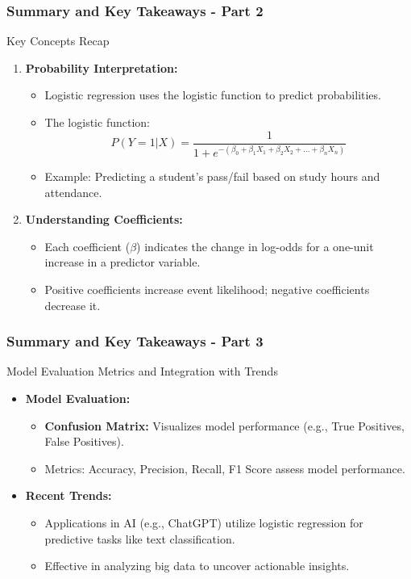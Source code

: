 \documentclass[aspectratio=169]{beamer}
\begin{document}
\begin{frame}[fragile]
    \frametitle{Summary and Key Takeaways - Part 2}
    \begin{block}{Key Concepts Recap}
        \begin{enumerate}
            \item \textbf{Probability Interpretation:}
                \begin{itemize}
                    \item Logistic regression uses the logistic function to predict probabilities.
                    \item The logistic function:
                    \[
                    P(Y=1|X) = \frac{1}{1 + e^{-(\beta_0 + \beta_1X_1 + \beta_2X_2 + \ldots + \beta_nX_n)}}
                    \]
                    \item Example: Predicting a student's pass/fail based on study hours and attendance.
                \end{itemize}
            \item \textbf{Understanding Coefficients:}
                \begin{itemize}
                    \item Each coefficient (\(\beta\)) indicates the change in log-odds for a one-unit increase in a predictor variable.
                    \item Positive coefficients increase event likelihood; negative coefficients decrease it.
                \end{itemize}
        \end{enumerate}
    \end{block}
\end{frame}

\begin{frame}[fragile]
    \frametitle{Summary and Key Takeaways - Part 3}
    \begin{block}{Model Evaluation Metrics and Integration with Trends}
        \begin{itemize}
            \item \textbf{Model Evaluation:}
                \begin{itemize}
                    \item \textbf{Confusion Matrix:} Visualizes model performance (e.g., True Positives, False Positives).
                    \item Metrics: Accuracy, Precision, Recall, F1 Score assess model performance.
                \end{itemize}
            \item \textbf{Recent Trends:}
                \begin{itemize}
                    \item Applications in AI (e.g., ChatGPT) utilize logistic regression for predictive tasks like text classification.
                    \item Effective in analyzing big data to uncover actionable insights.
                \end{itemize}
        \end{itemize}
    \end{block}
\end{frame}
\end{document}
